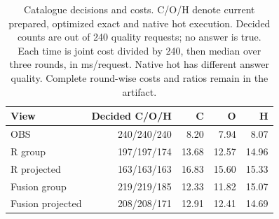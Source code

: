 \begin{table}[tb]
\centering\small
\caption{Catalogue decisions and costs. C/O/H denote current prepared, optimized exact and native hot execution. Decided counts are out of 240 quality requests; no answer is true. Each time is joint cost divided by 240, then median over three rounds, in ms/request. Native hot has different answer quality. Complete round-wise costs and ratios remain in the artifact.}
\label{tab:catalogue-workflow}
\begin{tabular}{lrrrr}
\toprule
View & Decided C/O/H & C & O & H \\
\midrule
OBS & 240/240/240 & 8.20 & 7.94 & 8.07 \\
R group & 197/197/174 & 13.68 & 12.57 & 14.96 \\
R projected & 163/163/163 & 16.83 & 15.60 & 15.33 \\
Fusion group & 219/219/185 & 12.33 & 11.82 & 15.07 \\
Fusion projected & 208/208/171 & 12.91 & 12.41 & 14.69 \\
\bottomrule
\end{tabular}
\end{table}
